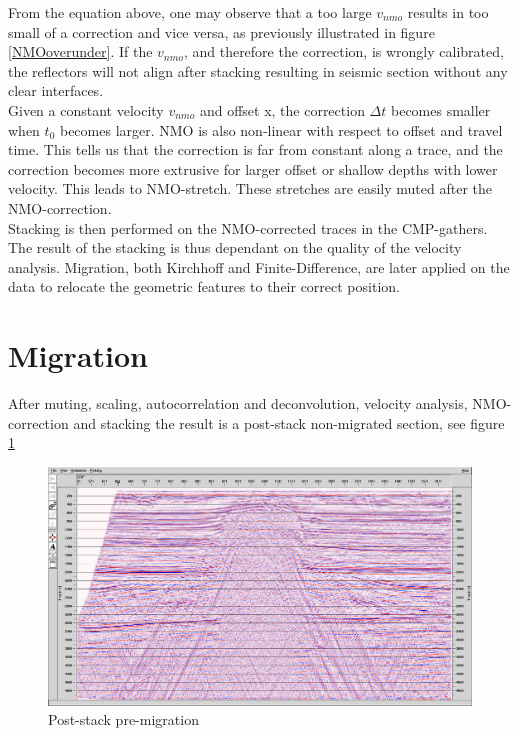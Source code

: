 \documentclass[10pt,a4paper]{article}
\begin{document}
\noindent From the equation above, one may observe that a too large $v_{nmo}$ results in too small of a correction and vice versa, as previously illustrated in figure \ref{NMOoverunder}. If the $v_{nmo}$, and therefore the correction, is wrongly calibrated, the reflectors will not align after stacking resulting in seismic section without any clear interfaces. 
\\
Given a constant velocity $v_{nmo}$ and offset x, the correction $\Delta t$ becomes smaller when $t_0$ becomes larger. NMO is also non-linear with respect to offset and travel time. This tells us that the correction is far from constant along a trace, and the correction becomes more extrusive for larger offset or shallow depths with lower velocity. This leads to NMO-stretch. These stretches are easily muted after the NMO-correction.
\\
Stacking is then performed on the NMO-corrected traces in the CMP-gathers. The result of the stacking is thus dependant on the quality of the velocity analysis.  Migration, both Kirchhoff and Finite-Difference, are later applied on the data to relocate the geometric features to their correct position.

\section{Migration}

After muting, scaling, autocorrelation and deconvolution, velocity analysis, NMO-correction and stacking the result is a post-stack non-migrated section, see figure \ref{fmig}

\begin{figure}[H]
\includegraphics[width=\textwidth]{fmig.jpg}
\caption{Post-stack pre-migration}
\label{fmig}
\end{figure}
\end{document}

